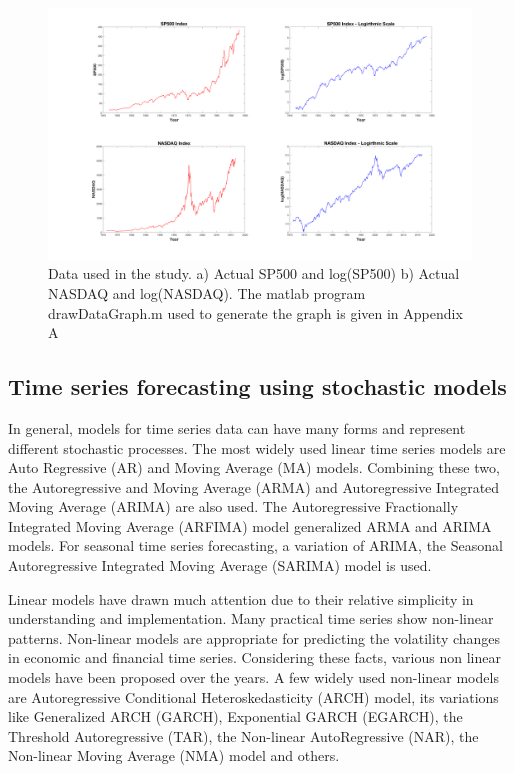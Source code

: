 \begin{figure}[!ht]
\centering
\includegraphics[scale=.15]{Images/RawData}
\caption{Data used in the study. a) Actual SP500 and log(SP500) b) Actual NASDAQ and log(NASDAQ). The matlab program drawDataGraph.m used to generate the graph is given in Appendix A}
\label{fig:rawdata}
\end{figure}

\subsection{Time series forecasting using stochastic models}
In general, models for time series data can have many forms and represent different stochastic processes. The most widely used linear time series models are Auto Regressive (AR) and Moving Average (MA) models. Combining these two, the Autoregressive and Moving Average (ARMA) and Autoregressive Integrated Moving Average (ARIMA) are also used. The Autoregressive Fractionally Integrated Moving Average (ARFIMA) model generalized ARMA and ARIMA models. For seasonal time series forecasting, a variation of ARIMA, the Seasonal Autoregressive Integrated Moving Average (SARIMA) model is used. 

Linear models have drawn much attention due to their relative simplicity in understanding and implementation. Many practical time series show non-linear patterns. Non-linear models are appropriate for predicting the volatility changes in economic and financial time series. Considering these facts, various non linear models have been proposed over the years. A few widely used non-linear models are Autoregressive Conditional Heteroskedasticity (ARCH) model, its variations like Generalized ARCH (GARCH), Exponential GARCH (EGARCH), the Threshold Autoregressive (TAR), the Non-linear AutoRegressive (NAR), the Non-linear Moving Average (NMA) model and others. 

